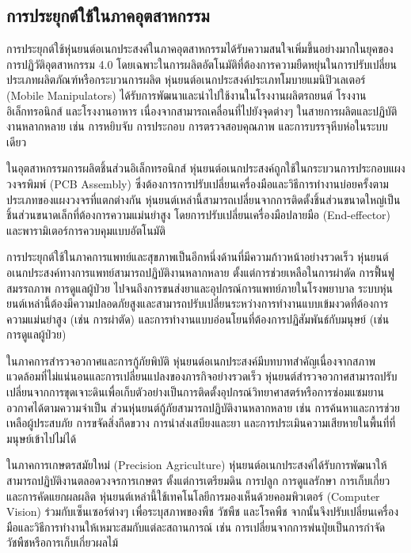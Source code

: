 \documentclass[a4paper]{article}
\begin{document}
\subsection{การประยุกต์ใช้ในภาคอุตสาหกรรม}

การประยุกต์ใช้หุ่นยนต์อเนกประสงค์ในภาคอุตสาหกรรมได้รับความสนใจเพิ่มขึ้นอย่างมากในยุคของการปฏิวัติอุตสาหกรรม 4.0 โดยเฉพาะในการผลิตอัตโนมัติที่ต้องการความยืดหยุ่นในการปรับเปลี่ยนประเภทผลิตภัณฑ์หรือกระบวนการผลิต \parencite{mohammadi2023mobile} หุ่นยนต์อเนกประสงค์ประเภทโมบายแมนิปิวเลเตอร์ (Mobile Manipulators) ได้รับการพัฒนาและนำไปใช้งานในโรงงานผลิตรถยนต์ โรงงานอิเล็กทรอนิกส์ และโรงงานอาหาร เนื่องจากสามารถเคลื่อนที่ไปยังจุดต่างๆ ในสายการผลิตและปฏิบัติงานหลากหลาย เช่น การหยิบจับ การประกอบ การตรวจสอบคุณภาพ และการบรรจุหีบห่อในระบบเดียว

ในอุตสาหกรรมการผลิตชิ้นส่วนอิเล็กทรอนิกส์ หุ่นยนต์อเนกประสงค์ถูกใช้ในกระบวนการประกอบแผงวงจรพิมพ์ (PCB Assembly) ซึ่งต้องการการปรับเปลี่ยนเครื่องมือและวิธีการทำงานบ่อยครั้งตามประเภทของแผงวงจรที่แตกต่างกัน หุ่นยนต์เหล่านี้สามารถเปลี่ยนจากการติดตั้งชิ้นส่วนขนาดใหญ่เป็นชิ้นส่วนขนาดเล็กที่ต้องการความแม่นยำสูง โดยการปรับเปลี่ยนเครื่องมือปลายมือ (End-effector) และพารามิเตอร์การควบคุมแบบอัตโนมัติ

การประยุกต์ใช้ในภาคการแพทย์และสุขภาพเป็นอีกหนึ่งด้านที่มีความก้าวหน้าอย่างรวดเร็ว หุ่นยนต์อเนกประสงค์ทางการแพทย์สามารถปฏิบัติงานหลากหลาย ตั้งแต่การช่วยเหลือในการผ่าตัด การฟื้นฟูสมรรถภาพ การดูแลผู้ป่วย ไปจนถึงการขนส่งยาและอุปกรณ์การแพทย์ภายในโรงพยาบาล ระบบหุ่นยนต์เหล่านี้ต้องมีความปลอดภัยสูงและสามารถปรับเปลี่ยนระหว่างการทำงานแบบเข้มงวดที่ต้องการความแม่นยำสูง (เช่น การผ่าตัด) และการทำงานแบบอ่อนโยนที่ต้องการปฏิสัมพันธ์กับมนุษย์ (เช่น การดูแลผู้ป่วย) \parencite{stueckler2023hollie}

ในภาคการสำรวจอวกาศและการกู้ภัยพิบัติ หุ่นยนต์อเนกประสงค์มีบทบาทสำคัญเนื่องจากสภาพแวดล้อมที่ไม่แน่นอนและการเปลี่ยนแปลงของภารกิจอย่างรวดเร็ว หุ่นยนต์สำรวจอวกาศสามารถปรับเปลี่ยนจากการขุดเจาะดินเพื่อเก็บตัวอย่างเป็นการติดตั้งอุปกรณ์วิทยาศาสตร์หรือการซ่อมแซมยานอวกาศได้ตามความจำเป็น ส่วนหุ่นยนต์กู้ภัยสามารถปฏิบัติงานหลากหลาย เช่น การค้นหาและการช่วยเหลือผู้ประสบภัย การขจัดสิ่งกีดขวาง การนำส่งเสบียงและยา และการประเมินความเสียหายในพื้นที่ที่มนุษย์เข้าไปไม่ได้

ในภาคการเกษตรสมัยใหม่ (Precision Agriculture) หุ่นยนต์อเนกประสงค์ได้รับการพัฒนาให้สามารถปฏิบัติงานตลอดวงจรการเกษตร ตั้งแต่การเตรียมดิน การปลูก การดูแลรักษา การเก็บเกี่ยว และการคัดแยกผลผลิต หุ่นยนต์เหล่านี้ใช้เทคโนโลยีการมองเห็นด้วยคอมพิวเตอร์ (Computer Vision) ร่วมกับเซ็นเซอร์ต่างๆ เพื่อระบุสภาพของพืช วัชพืช และโรคพืช จากนั้นจึงปรับเปลี่ยนเครื่องมือและวิธีการทำงานให้เหมาะสมกับแต่ละสถานการณ์ เช่น การเปลี่ยนจากการพ่นปุ่ยเป็นการกำจัดวัชพืชหรือการเก็บเกี่ยวผลไม้
\end{document}
